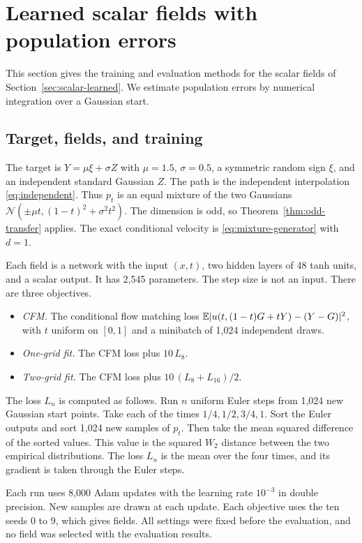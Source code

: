 \section{Learned scalar fields with population errors}
\label{app:scalar-population}
This section gives the training and evaluation methods for the scalar
fields of Section~\ref{sec:scalar-learned}. We estimate population
errors by numerical integration over a Gaussian start.\AIassistance

\subsection{Target, fields, and training}
The target is $Y=\mu\xi+\sigma Z$ with $\mu=1.5$, $\sigma=0.5$, a
symmetric random sign $\xi$, and an independent standard Gaussian $Z$.
The path is the independent interpolation \eqref{eq:independent}. Thus
$p_t$ is an equal mixture of the two Gaussians
$\mathcal N(\pm\mu t,(1-t)^2+\sigma^2t^2)$. The dimension is odd, so
Theorem~\ref{thm:odd-transfer} applies. The exact conditional velocity is
\eqref{eq:mixture-generator} with $d=1$.

Each field is a network with the input $(x,t)$, two hidden layers of 48
tanh units, and a scalar output. It has 2,545 parameters. The step size
is not an input. There are three objectives.
\begin{itemize}
\item \emph{CFM.} The conditional flow matching loss
$\mathbb E|u(t,(1-t)G+tY)-(Y-G)|^2$, with $t$ uniform on $[0,1]$ and a
minibatch of 1,024 independent draws.
\item \emph{One-grid fit.} The CFM loss plus $10\,L_8$.
\item \emph{Two-grid fit.} The CFM loss plus $10\,(L_8+L_{16})/2$.
\end{itemize}
The loss $L_n$ is computed as follows. Run $n$ uniform Euler steps from
1,024 new Gaussian start points. Take each of the times
$1/4,1/2,3/4,1$. Sort the Euler outputs and sort 1,024 new samples of
$p_t$. Then take the mean squared difference of the sorted values. This value is the squared
$W_2$ distance between the two empirical distributions. The loss $L_n$
is the mean over the four times, and its gradient is taken through the
Euler steps.

Each run uses 8,000 Adam updates with the learning rate $10^{-3}$ in
double precision. New samples are drawn at each update. Each objective
uses the ten seeds 0 to 9, which gives \ScalarModelCount{} fields. All
settings were fixed before the evaluation, and no field was selected
with the evaluation results.

